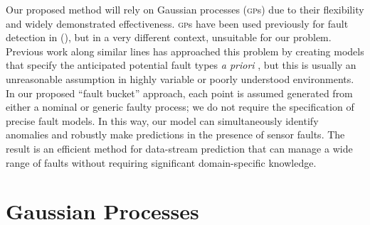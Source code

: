 \documentclass[letterpaper]{article}
\newcommand{\acro}[1]{\textsc{\MakeLowercase{#1}}}
\newcommand{\citet}[1]{\citeauthor{#1} (\citeyear{#1})}
\begin{document}
Our proposed method will rely on Gaussian processes (\acro{gp}s) due
to their flexibility and widely demonstrated effectiveness. \acro{gp}s have been used previously for
fault detection in \citet{Eciolaza2001}, but in a very different
context, unsuitable for our problem. Previous work along similar lines
has approached this problem by creating models that
specify
the anticipated potential fault types \textit{a priori}
\cite{garnettosborne}, but this is usually an unreasonable assumption
in highly variable or poorly understood environments. 
In our proposed  ``fault bucket'' approach, each point is assumed generated from either a nominal or generic faulty process; we do not require the specification of precise fault models. In
this way, our model can simultaneously identify anomalies and robustly
make predictions in the presence of sensor faults. 
The result is an efficient method for data-stream prediction
that can manage a
wide range of faults without requiring significant
domain-specific knowledge.


% 
% 

\section{Gaussian Processes}
\end{document}
